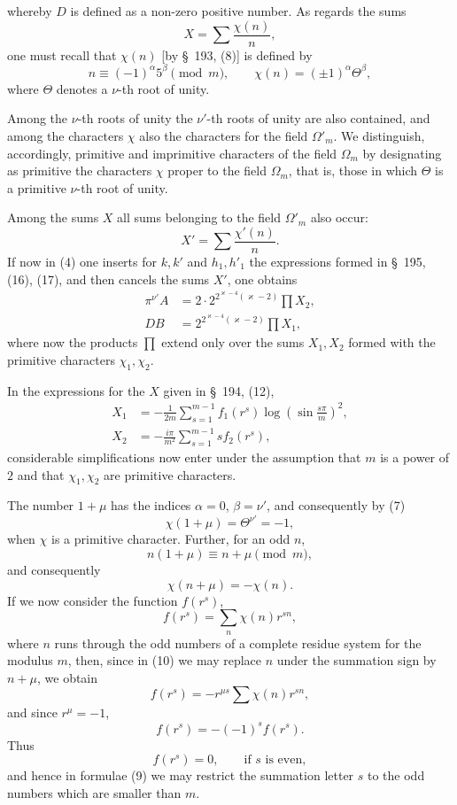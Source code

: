 \documentclass[11pt]{article}
\begin{document}
whereby $D$ is defined as a non-zero positive number. As regards the sums
\[
X=\sum\frac{\chi(n)}{n},
\]
one must recall that $\chi(n)$ [by \S~193, (8)] is defined by
\begin{equation}
n\equiv(-1)^\alpha5^\beta\pmod m,
\qquad
\chi(n)=(\pm1)^\alpha\Theta^\beta,
\tag{7}
\end{equation}
where $\Theta$ denotes a $\nu$-th root of unity.

Among the $\nu$-th roots of unity the $\nu'$-th roots of unity are also contained, and among the characters $\chi$ also the characters for the field $\Omega'_m$. We distinguish, accordingly, primitive and imprimitive characters of the field $\Omega_m$ by designating as primitive the characters $\chi$ proper to the field $\Omega_m$, that is, those in which $\Theta$ is a primitive $\nu$-th root of unity.

Among the sums $X$ all sums belonging to the field $\Omega'_m$ also occur:
\[
X'=\sum\frac{\chi'(n)}{n}.
\]
If now in (4) one inserts for $k,k'$ and $h_1,h'_1$ the expressions formed in \S~195, (16), (17), and then cancels the sums $X'$, one obtains
\begin{equation}
\begin{aligned}
\pi^{\nu'}A&=2\cdot2^{2^{\varkappa-4}(\varkappa-2)}\prod X_2,\\
DB&=2^{2^{\varkappa-4}(\varkappa-2)}\prod X_1,
\end{aligned}
\tag{8}
\end{equation}
where now the products $\prod$ extend only over the sums $X_1,X_2$ formed with the primitive characters $\chi_1,\chi_2$.

In the expressions for the $X$ given in \S~194, (12),
\begin{equation}
\begin{aligned}
X_1&=-\frac1{2m}\sum_{s=1}^{m-1} f_1(r^s)\log\left(\sin\frac{s\pi}{m}\right)^2,\\
X_2&=-\frac{i\pi}{m^2}\sum_{s=1}^{m-1} s f_2(r^s),
\end{aligned}
\tag{9}
\end{equation}
considerable simplifications now enter under the assumption that $m$ is a power of $2$ and that $\chi_1,\chi_2$ are primitive characters.

The number $1+\mu$ has the indices $\alpha=0$, $\beta=\nu'$, and consequently by (7)
\[
\chi(1+\mu)=\Theta^{\nu'}=-1,
\]
when $\chi$ is a primitive character. Further, for an odd $n$,
\[
n(1+\mu)\equiv n+\mu\pmod m,
\]
and consequently
\[
\chi(n+\mu)=-\chi(n).
\]
If we now consider the function $f(r^s)$,
\begin{equation}
f(r^s)=\sum_n\chi(n)r^{sn},
\tag{10}
\end{equation}
where $n$ runs through the odd numbers of a complete residue system for the modulus $m$, then, since in (10) we may replace $n$ under the summation sign by $n+\mu$, we obtain
\[
f(r^s)=-r^{\mu s}\sum\chi(n)r^{sn},
\]
and since $r^\mu=-1$,
\[
f(r^s)=-(-1)^s f(r^s).
\]
Thus
\begin{equation}
f(r^s)=0,\qquad\text{if }s\text{ is even},
\tag{11}
\end{equation}
and hence in formulae (9) we may restrict the summation letter $s$ to the odd numbers which are smaller than $m$.
\end{document}
